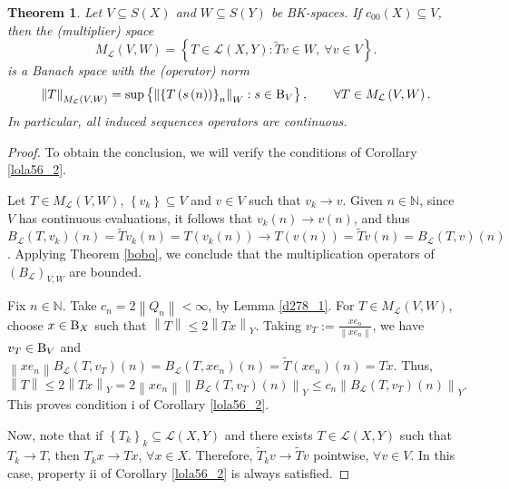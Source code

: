 \documentclass[14pt, a4paper]{article}  %
\newcounter{property}
\providecommand{\llave}[1]{\left\lbrace #1\right\rbrace }
\providecommand{\pare}[1]{\left( #1\right) }
\providecommand{\norm}[1]{\left\lVert#1\right\rVert}
\newcommand{\tien}{\rightarrow}
\newcommand{\N}{\mathbb{N}}
\newcommand{\B}{\textup{B}}
\newtheorem{theorem}{Theorem}[section]
\begin{document}
\begin{theorem}\label{efren10} Let  $V\subseteq S\pare{X}$ and  $W\subseteq S\pare{Y}$ be BK-spaces. If $c_{00}\pare{X}\subseteq V$, then  the (multiplier) space  
	\begin{equation}
		M_{\mathcal{L}}\pare{V,W}=\llave{T\in \mathcal{L}\pare{X,Y}:\widetilde{T}v\in W, \ \forall v\in V}.
	\end{equation}  is a Banach space with the (operator) norm  
	\begin{equation}
	\norm{T}_{M_{\mathcal{L}}\pare{V,W}} = \sup\llave{\norm{\llave{T\pare{s\pare{n}}}_{n}}_{W}:s\in \B_{V}},\qquad \forall T\in M_{\mathcal{L}}\pare{V,W}.
	\end{equation}  In particular, all induced sequences  operators are
	continuous. 
\end{theorem}
\begin{proof}To obtain the conclusion, we will verify the conditions of Corollary \ref{lola56_2}.
	
	Let  $T\in 	M_{\mathcal{L}}\pare{V,W}$, $\llave{v_{k}}\subseteq V$ and $v\in V$ such that $v_{k}\tien v$. Given  $n\in \N$, since  $V$ has continuous evaluations, it follows that $v_{k}\pare{n}\tien v\pare{n}$, and thus  $B_{\mathcal{L}}  \pare{T,v_{k}}\pare{n}=\widetilde{T}v_{k}\pare{n}=T\pare{v_{k}\pare{n}}\tien T\pare{v\pare{n}}=\widetilde{T}v\pare{n}=	B_{\mathcal{L}}  \pare{T,v}\pare{n}$. 
	Applying Theorem \ref{bobo}, we conclude that the multiplication operators of $\pare{B_{\mathcal{L}}}_{V,W}$ are bounded.
	
	Fix  $n\in \N$.  Take $c_{n}=2\norm{Q_{n}}<\infty$, by Lemma \ref{d278_1}.  For  $T\in 	M_{\mathcal{L}}\pare{V,W}$, choose  $x\in \B_{X}$ such that $\norm{T}\leq 2\norm{Tx}_{Y}$. Taking  $v_{T}:=\frac{xe_{n}}{\norm{xe_{n}}}$, we have $v_{T}\in \B_{V}$ and $\norm{xe_{n}}B_{\mathcal{L}}\pare{T,v_{T}}\pare{n}=B_{\mathcal{L}}\pare{T,xe_{n}}\pare{n}=\widetilde{T}\pare{xe_{n}}\pare{n}=Tx$. Thus, \begin{equation}
		\norm{T}\leq 2\norm{Tx}_{Y} = 2\norm{xe_{n}} \norm{B_{\mathcal{L}}\pare{T,v_{T}}\pare{n}}_{Y}\leq c_{n} \norm{B_{\mathcal{L}}\pare{T,v_{T}}\pare{n}}_{Y}.
	\end{equation} This proves condition i of Corollary \ref{lola56_2}.
	
	Now, note that if $\llave{T_{k}}_{k}\subseteq 	\mathcal{L}\pare{X,Y}$ and there exists $T\in \mathcal{L}\pare{X,Y}$ such that $T_{k}\tien T$, then  $T_{k}x\tien Tx$, $\forall x\in X$. Therefore,  $\widetilde{T}_{k}v\tien \widetilde{T}v$ pointwise, $\forall v\in V$. In this case, property ii of Corollary \ref{lola56_2} is always satisfied.   
\end{proof}
\end{document}
